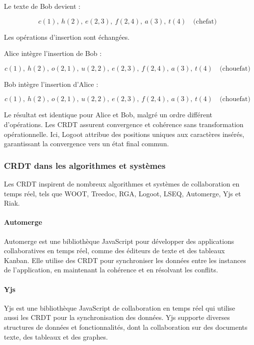 Le texte de Bob devient :

\begin{equation}
c(1), \ h(2), \ e(2, 3), \ f(2, 4), \ a(3), \ t(4) \quad \text{(chefat)}
\end{equation}

Les opérations d'insertion sont échangées.

Alice intègre l'insertion de Bob :

\begin{equation}
c(1), \ h(2), \ o(2, 1), \ u(2, 2), \ e(2, 3), \ f(2, 4), \ a(3), \ t(4) \quad \text{(chouefat)}
\end{equation}

Bob intègre l'insertion d'Alice :

\begin{equation}
c(1), \ h(2), \ o(2, 1), \ u(2, 2), \ e(2, 3), \ f(2, 4), \ a(3), \ t(4) \quad \text{(chouefat)}
\end{equation}

Le résultat est identique pour Alice et Bob, malgré un ordre différent d'opérations. Les CRDT assurent convergence et cohérence sans transformation opérationnelle. Ici, Logoot attribue des positions uniques aux caractères insérés, garantissant la convergence vers un état final commun.
\subsubsection{CRDT dans les algorithmes et systèmes}

Les CRDT inspirent de nombreux algorithmes et systèmes de collaboration en temps réel, tels que WOOT, Treedoc, RGA, Logoot, LSEQ, Automerge, Yjs et Riak.

\paragraph{Automerge}

Automerge est une bibliothèque JavaScript pour développer des applications collaboratives en temps réel, comme des éditeurs de texte et des tableaux Kanban. Elle utilise des CRDT pour synchroniser les données entre les instances de l'application, en maintenant la cohérence et en résolvant les conflits.

\paragraph{Yjs}

Yjs est une bibliothèque JavaScript de collaboration en temps réel qui utilise aussi les CRDT pour la synchronisation des données. Yjs supporte diverses structures de données et fonctionnalités, dont la collaboration sur des documents texte, des tableaux et des graphes.

